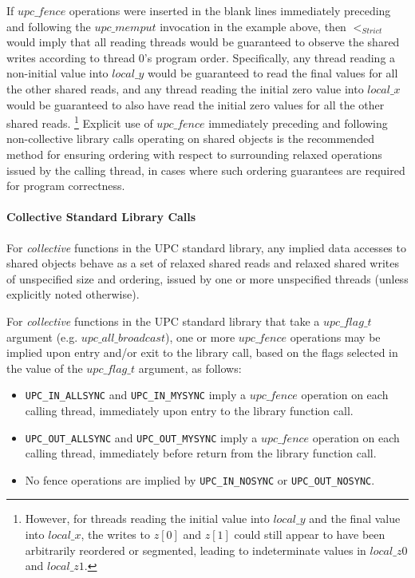 \np If $upc\_fence$ operations were inserted in the blank lines immediately
preceding and following the $upc\_memput$ invocation in the example above, then
$<_{Strict}$ would imply that all reading threads would be guaranteed to observe
the shared writes according to thread 0's program order.  Specifically, any
thread reading a non-initial value into $local\_y$ would be guaranteed to read
the final values for all the other shared reads, and any thread reading the
initial zero value into $local\_x$ would be guaranteed to also have read the
initial zero values for all the other shared reads.%
\footnote{However, for threads reading the initial value into $local\_y$ and
the final value into $local\_x$, the writes to $z[0]$ and $z[1]$ could still
appear to have been arbitrarily reordered or segmented, leading to
indeterminate values in $local\_z0$ and $local\_z1$.}
Explicit use of $upc\_fence$ immediately preceding and following non-collective
library calls operating on shared objects is the recommended method for
ensuring ordering with respect to surrounding relaxed operations issued by the
calling thread, in cases where such ordering guarantees are required
for program correctness.

\paragraph{Collective Standard Library Calls}

\npf For {\it collective} functions in the UPC standard library, any implied data
accesses to shared objects behave as a set of relaxed shared reads and relaxed
shared writes of unspecified size and ordering, issued by one or more
unspecified threads (unless explicitly noted otherwise).

\np For {\it collective} functions in the UPC standard library
that take a $upc\_flag\_t$
argument (e.g. $upc\_all\_broadcast$), one or more $upc\_fence$ operations
may be implied upon entry and/or exit to the library call, 
based on the flags selected in the value of the $upc\_flag\_t$ argument, as follows:

\begin{itemize}
\item
{\tt UPC\_IN\_ALLSYNC} and {\tt UPC\_IN\_MYSYNC} imply a $upc\_fence$ operation on 
each calling thread, immediately upon entry to the library function call.

\item
{\tt UPC\_OUT\_ALLSYNC} and {\tt UPC\_OUT\_MYSYNC} imply a $upc\_fence$ operation on 
each calling thread, immediately before return from the library function call.

\item 
No fence operations are implied by {\tt UPC\_IN\_NOSYNC} or {\tt UPC\_OUT\_NOSYNC}.
\end{itemize}


